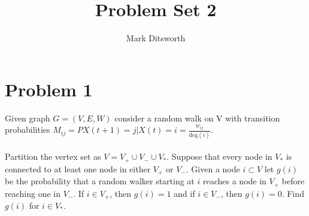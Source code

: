 \documentclass{amsart}
\title{Problem Set 2}
\author{Mark Ditsworth}
\begin{document}
	\maketitle
	\section{Problem 1}
	Given graph $G=(V,E,W)$ consider a random walk on V with transition probabilities $M_{ij} = P{X(t+1)=j | X(t)=i} = \frac{w_{ij}}{\text{deg}(i)}$.
	\\\\
	Partition the vertex set as $V = V_+ \cup V_- \cup V_*$. Suppose that every node in $V_*$ is connected to at least one node in either $V_+$ or $V_-$. Given a node $i \subset V$ let $g(i)$ be the probability that a random walker starting at $i$ reaches a node in $V_+$ before reaching one in $V_-$. If $i \in V_+$, then $g(i)=1$ and if $i \in V_-$, then $g(i)=0$. Find $g(i)$ for $i \in V_*$.
	\\\\
	
\end{document}
